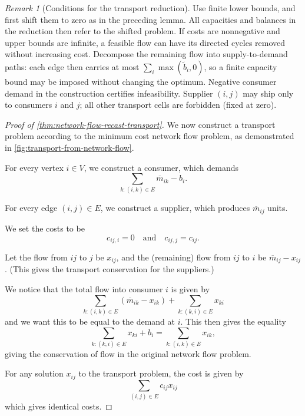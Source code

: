 \documentclass[11pt]{article}
\theoremstyle{definition}
\theoremstyle{remark}
\newtheorem{remark}[theorem]{Remark}
\newcommand{\pqty}[1]{\left(#1\right)}
\newcommand{\qand}{\quad\text{and}\quad}
\begin{document}
\begin{remark}[Conditions for the transport reduction]
Use finite lower bounds, and first shift them to zero as in the preceding lemma.
All capacities and balances in the reduction then refer to the shifted problem.
If costs are nonnegative and upper bounds are infinite, a feasible flow can have
its directed cycles removed without increasing cost. Decompose the remaining flow
into supply-to-demand paths: each edge then carries at most
\(\sum_i\max(\tilde b_i,0)\), so a finite capacity bound may be imposed without
changing the optimum. Negative consumer demand in the construction certifies
infeasibility. Supplier \((i,j)\) may ship only to consumers \(i\) and \(j\);
all other transport cells are forbidden (fixed at zero).
\end{remark}
\begin{proof}[Proof of \autoref{thm:network-flow-recast-transport}]
    We now construct a transport problem according to the minimum cost network flow problem, as demonstrated in \autoref{fig:transport-from-network-flow}.

    For every vertex \(i \in V\), we construct a consumer, which demands
    \[
        \sum_{k: \pqty{i, k} \in E} \overline{m}_{ik} - b_i.
    \]

    For every edge \(\pqty{i, j} \in E\), we construct a supplier, which produces \(\overline{m}_{ij}\) units.

    We set the costs to be
    \[
        c_{ij, i} = 0 \qand c_{ij, j} = c_{ij}.
    \]

    Let the flow from \(ij\) to \(j\) be \(x_{ij}\), and the (remaining) flow from \(ij\) to \(i\) be \(\overline{m}_{ij} - x_{ij}\). (This gives the transport conservation for the suppliers.)

    We notice that the total flow into consumer \(i\) is given by
    \[
        \sum_{k: \pqty{i, k} \in E} \pqty{\overline{m}_{ik} - x_{ik}} + \sum_{k: \pqty{k, i} \in E} x_{ki}
    \]
    and we want this to be equal to the demand at \(i\). This then gives the equality
    \[
        \sum_{k: \pqty{k, i} \in E} x_{ki} + b_i = \sum_{k: \pqty{i, k} \in E} x_{ik},
    \]
    giving the conservation of flow in the original network flow problem.

    For any solution \(x_{ij}\) to the transport problem, the cost is given by
    \[
        \sum_{\pqty{i, j} \in E} c_{ij} x_{ij}
    \]
    which gives identical costs.
\end{proof}
\end{document}
